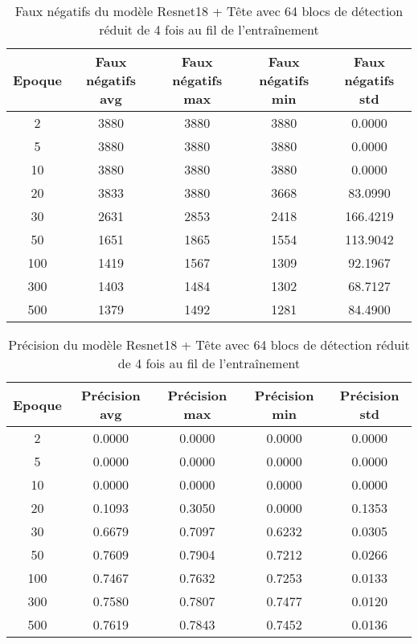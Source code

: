 \begin{table}[!ht]
    \caption{Faux négatifs du modèle Resnet18 + Tête avec 64 blocs de détection réduit de 4 fois au fil de l'entraînement}
    \label{tab:resnet18+head_64n_false_negative_reduced_4x_precision}
    \centering
    \begin{tabular}{ |c||c|c|c|c|  }
        \hline
        \rowcolor{gray!50}
        Epoque & Faux négatifs avg & Faux négatifs max & Faux négatifs min & Faux négatifs std\\
        \hline
        2 & 3880 & 3880 & 3880 & 0.0000\\
        5 & 3880 & 3880 & 3880 & 0.0000\\
        10 & 3880 & 3880 & 3880 & 0.0000\\
        20 & 3833 & 3880 & 3668 & 83.0990\\
        30 & 2631 & 2853 & 2418 & 166.4219\\
        50 & 1651 & 1865 & 1554 & 113.9042\\
        100 & 1419 & 1567 & 1309 & 92.1967\\
        300 & 1403 & 1484 & 1302 & 68.7127\\
        500 & 1379 & 1492 & 1281 & 84.4900\\
        \hline
    \end{tabular}
\end{table}

\begin{table}[!ht]
    \caption{Précision du modèle Resnet18 + Tête avec 64 blocs de détection réduit de 4 fois au fil de l'entraînement}
    \label{tab:resnet18+head_64n_reduced_4x_precision}
    \centering
    \begin{tabular}{ |c||c|c|c|c|  }
        \hline
        \rowcolor{gray!50}
        Epoque & Précision avg & Précision max & Précision min & Précision std\\
        \hline
        2 & 0.0000 & 0.0000 & 0.0000 & 0.0000\\
        5 & 0.0000 & 0.0000 & 0.0000 & 0.0000\\
        10 & 0.0000 & 0.0000 & 0.0000 & 0.0000\\
        20 & 0.1093 & 0.3050 & 0.0000 & 0.1353\\
        30 & 0.6679 & 0.7097 & 0.6232 & 0.0305\\
        50 & 0.7609 & 0.7904 & 0.7212 & 0.0266\\
        100 & 0.7467 & 0.7632 & 0.7253 & 0.0133\\
        300 & 0.7580 & 0.7807 & 0.7477 & 0.0120\\
        500 & 0.7619 & 0.7843 & 0.7452 & 0.0136\\
        \hline
    \end{tabular}
\end{table}

